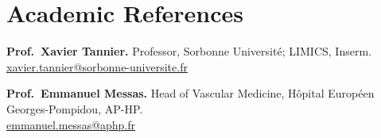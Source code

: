 \documentclass[10pt,letterpaper]{article}
\begin{document}
\section{Academic References}
\textbf{Prof.\ Xavier Tannier.} Professor, Sorbonne Université; LIMICS, Inserm.\\
\href{mailto:xavier.tannier@sorbonne-universite.fr}{xavier.tannier@sorbonne-universite.fr}\par\vspace{4pt}
\textbf{Prof.\ Emmanuel Messas.} Head of Vascular Medicine, Hôpital Européen Georges-Pompidou, AP-HP.\\
\href{mailto:emmanuel.messas@aphp.fr}{emmanuel.messas@aphp.fr}
\end{document}
